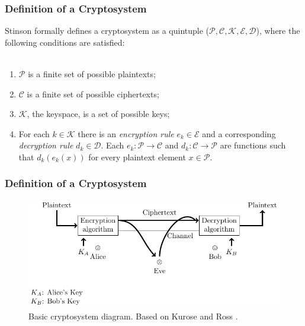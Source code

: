 \documentclass{beamer}
\begin{document}
\begin{frame}
\frametitle{Definition of a Cryptosystem}

Stinson \cite{stinson2005cryptography} formally defines a cryptosystem as a quintuple ($\mathcal{P}, \mathcal{C}, \mathcal{K}, \mathcal{E}, \mathcal{D}$), where the following conditions are satisfied:  \\~\\
\begin{enumerate}
  \setlength\itemsep{1em}
\item $\mathcal{P}$ is a finite set of possible plaintexts;
\item $\mathcal{C}$ is a finite set of possible ciphertexts;
\item $\mathcal{K}$, the keyspace, is a set of possible keys;
\item For each $k \in \mathcal{K}$ there is an \textit{encryption rule} $ e_{k} \in \mathcal{E}$  and a corresponding \textit{decryption rule} $ d_{k} \in \mathcal{D}$. Each $e_{k}: \mathcal{P} \rightarrow \mathcal{C}$ and $d_{k}: \mathcal{C} \rightarrow \mathcal{P}$ are functions such that $d_{k}(e_{k}(x))$ for every plaintext element $x \in \mathcal{P}$.
\end{enumerate}

\end{frame}

\begin{frame}
\frametitle{Definition of a Cryptosystem}

\begin{figure}[H]
  \centering
  \includegraphics[width=\textwidth]{../img/basiccryptosystem}
  \caption[Basic cryptosystem diagram]{Basic cryptosystem diagram. Based on Kurose and Ross \cite{kurose2010computer}.}
  \label{fig:cryptoflow}
\end{figure}


\end{frame}
\end{document}
